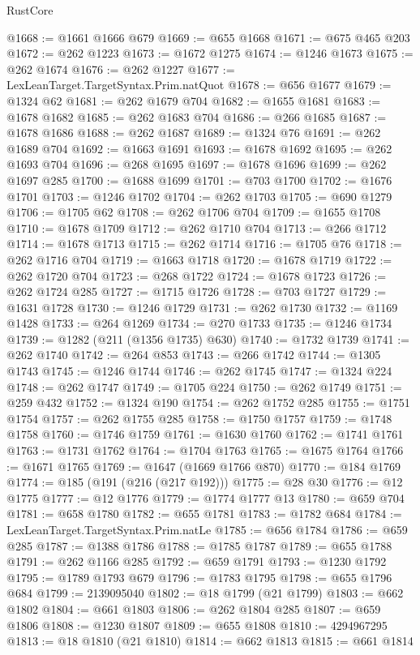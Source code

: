 \begin{lexlean}{RustCore}
\begin{coremodule}
@1668 := @1661 @1666 @679
@1669 := @655 @1668
@1671 := @675 @465 @203
@1672 := @262 @1223
@1673 := @1672 @1275
@1674 := @1246 @1673
@1675 := @262 @1674
@1676 := @262 @1227
@1677 := LexLeanTarget.TargetSyntax.Prim.natQuot
@1678 := @656 @1677
@1679 := @1324 @62
@1681 := @262 @1679 @704
@1682 := @1655 @1681
@1683 := @1678 @1682
@1685 := @262 @1683 @704
@1686 := @266 @1685
@1687 := @1678 @1686
@1688 := @262 @1687
@1689 := @1324 @76
@1691 := @262 @1689 @704
@1692 := @1663 @1691
@1693 := @1678 @1692
@1695 := @262 @1693 @704
@1696 := @268 @1695
@1697 := @1678 @1696
@1699 := @262 @1697 @285
@1700 := @1688 @1699
@1701 := @703 @1700
@1702 := @1676 @1701
@1703 := @1246 @1702
@1704 := @262 @1703
@1705 := @690 @1279
@1706 := @1705 @62
@1708 := @262 @1706 @704
@1709 := @1655 @1708
@1710 := @1678 @1709
@1712 := @262 @1710 @704
@1713 := @266 @1712
@1714 := @1678 @1713
@1715 := @262 @1714
@1716 := @1705 @76
@1718 := @262 @1716 @704
@1719 := @1663 @1718
@1720 := @1678 @1719
@1722 := @262 @1720 @704
@1723 := @268 @1722
@1724 := @1678 @1723
@1726 := @262 @1724 @285
@1727 := @1715 @1726
@1728 := @703 @1727
@1729 := @1631 @1728
@1730 := @1246 @1729
@1731 := @262 @1730
@1732 := @1169 @1428
@1733 := @264 @1269
@1734 := @270 @1733
@1735 := @1246 @1734
@1739 := @1282 (@211 (@1356 @1735) @630)
@1740 := @1732 @1739
@1741 := @262 @1740
@1742 := @264 @853
@1743 := @266 @1742
@1744 := @1305 @1743
@1745 := @1246 @1744
@1746 := @262 @1745
@1747 := @1324 @224
@1748 := @262 @1747
@1749 := @1705 @224
@1750 := @262 @1749
@1751 := @259 @432
@1752 := @1324 @190
@1754 := @262 @1752 @285
@1755 := @1751 @1754
@1757 := @262 @1755 @285
@1758 := @1750 @1757
@1759 := @1748 @1758
@1760 := @1746 @1759
@1761 := @1630 @1760
@1762 := @1741 @1761
@1763 := @1731 @1762
@1764 := @1704 @1763
@1765 := @1675 @1764
@1766 := @1671 @1765
@1769 := @1647 (@1669 @1766 @870)
@1770 := @184 @1769
@1774 := @185 (@191 (@216 (@217 @192)))
@1775 := @28 @30
@1776 := @12 @1775
@1777 := @12 @1776
@1779 := @1774 @1777 @13
@1780 := @659 @704
@1781 := @658 @1780
@1782 := @655 @1781
@1783 := @1782 @684
@1784 := LexLeanTarget.TargetSyntax.Prim.natLe
@1785 := @656 @1784
@1786 := @659 @285
@1787 := @1388 @1786
@1788 := @1785 @1787
@1789 := @655 @1788
@1791 := @262 @1166 @285
@1792 := @659 @1791
@1793 := @1230 @1792
@1795 := @1789 @1793 @679
@1796 := @1783 @1795
@1798 := @655 @1796 @684
@1799 := 2139095040
@1802 := @18 @1799 (@21 @1799)
@1803 := @662 @1802
@1804 := @661 @1803
@1806 := @262 @1804 @285
@1807 := @659 @1806
@1808 := @1230 @1807
@1809 := @655 @1808
@1810 := 4294967295
@1813 := @18 @1810 (@21 @1810)
@1814 := @662 @1813
@1815 := @661 @1814

\end{coremodule}
\end{lexlean}
